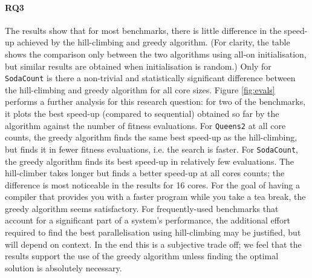 \paragraph{RQ3} The results show that for most benchmarks, there is little
difference in the speed-up achieved by the hill-climbing and greedy algorithm.
(For clarity, the table shows the comparison only between the two algorithms
using all-on initialisation, but similar results are obtained when
initialisation is random.) Only for \verb|SodaCount| is there a non-trivial and
statistically significant difference between the hill-climbing and greedy
algorithm for all core sizes.  Figure \ref{fig:evals} performs a further
analysis for this research question: for two of the benchmarks, it plots the
best speed-up (compared to sequential) obtained so far by the algorithm against
the number of fitness evaluations.  For \verb|Queens2| at all core counts, the
greedy algorithm finds the same best speed-up as the hill-climbing, but finds
it in fewer fitness evaluations, i.e. the search is faster.  For
\verb|SodaCount|, the greedy algorithm finds its best speed-up in relatively
few evaluations. The hill-climber takes longer but finds a better speed-up at
all cores counts; the difference is most noticeable in the results for 16
cores. For the goal of having a compiler that provides you with a faster
program while you take a tea break, the greedy algorithm seems satisfactory.
For frequently-used benchmarks that account for a significant part of a
system's performance, the additional effort required to find the best
parallelisation using hill-climbing may be justified, but will depend on
context. In the end this is a subjective trade off; we feel that the results
support the use of the greedy algorithm unless finding the optimal solution
is absolutely necessary.


